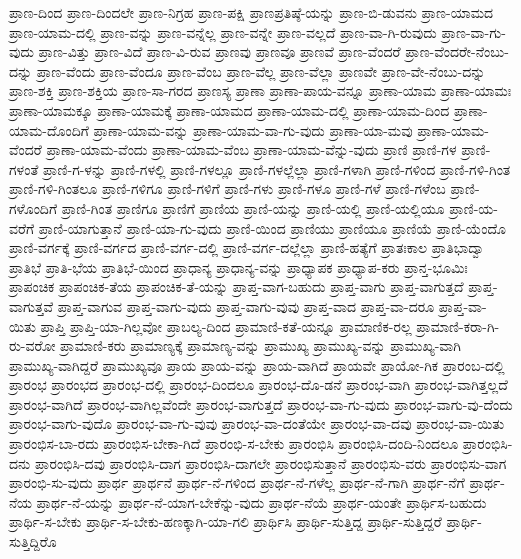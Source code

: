 {ಪ್ರಾಣ-ದಿಂದ
ಪ್ರಾಣ-ದಿಂದಲೇ
ಪ್ರಾಣ-ನಿಗ್ರಹ
ಪ್ರಾಣ-ಪಕ್ಷಿ
ಪ್ರಾಣಪ್ರತಿಷ್ಠೆ-ಯನ್ನು
ಪ್ರಾಣ-ಬಿ-ಡುವನು
ಪ್ರಾಣ-ಯಾಮದ
ಪ್ರಾಣ-ಯಾಮ-ದಲ್ಲಿ
ಪ್ರಾಣ-ವನ್ನು
ಪ್ರಾಣ-ವನ್ನೆಲ್ಲ
ಪ್ರಾಣ-ವನ್ನೇ
ಪ್ರಾಣ-ವಲ್ಲದೆ
ಪ್ರಾಣ-ವಾ-ಗಿ-ರುವುದು
ಪ್ರಾಣ-ವಾ-ಗು-ವುದು
ಪ್ರಾಣ-ವಿತ್ತು
ಪ್ರಾಣ-ವಿದೆ
ಪ್ರಾಣ-ವಿ-ರುವ
ಪ್ರಾಣವು
ಪ್ರಾಣವೂ
ಪ್ರಾಣವೆ
ಪ್ರಾಣ-ವೆಂದರೆ
ಪ್ರಾಣ-ವೆಂದರೇ-ನೆಂಬು-ದನ್ನು
ಪ್ರಾಣ-ವೆಂದು
ಪ್ರಾಣ-ವೆಂದೂ
ಪ್ರಾಣ-ವೆಂಬ
ಪ್ರಾಣ-ವೆಲ್ಲ
ಪ್ರಾಣ-ವೆಲ್ಲಾ
ಪ್ರಾಣವೇ
ಪ್ರಾಣ-ವೇ-ನೆಂಬು-ದನ್ನು
ಪ್ರಾಣ-ಶಕ್ತಿ
ಪ್ರಾಣ-ಶಕ್ತಿಯ
ಪ್ರಾಣ-ಸಾ-ಗರದ
ಪ್ರಾಣಸ್ಯ
ಪ್ರಾಣಾ
ಪ್ರಾಣಾ-ಪಾಯ-ವನ್ನೂ
ಪ್ರಾಣಾ-ಯಾಮ
ಪ್ರಾಣಾ-ಯಾಮಃ
ಪ್ರಾಣಾ-ಯಾಮಕ್ಕೂ
ಪ್ರಾಣಾ-ಯಾಮಕ್ಕೆ
ಪ್ರಾಣಾ-ಯಾಮದ
ಪ್ರಾಣಾ-ಯಾಮ-ದಲ್ಲಿ
ಪ್ರಾಣಾ-ಯಾಮ-ದಿಂದ
ಪ್ರಾಣಾ-ಯಾಮ-ದೊಂದಿಗೆ
ಪ್ರಾಣಾ-ಯಾಮ-ವನ್ನು
ಪ್ರಾಣಾ-ಯಾಮ-ವಾ-ಗು-ವುದು
ಪ್ರಾಣಾ-ಯಾ-ಮವು
ಪ್ರಾಣಾ-ಯಾಮ-ವೆಂದರೆ
ಪ್ರಾಣಾ-ಯಾಮ-ವೆಂದು
ಪ್ರಾಣಾ-ಯಾಮ-ವೆಂಬ
ಪ್ರಾಣಾ-ಯಾಮ-ವೆನ್ನು-ವುದು
ಪ್ರಾಣಿ
ಪ್ರಾಣಿ-ಗಳ
ಪ್ರಾಣಿ-ಗಳಂತೆ
ಪ್ರಾಣಿ-ಗ-ಳನ್ನು
ಪ್ರಾಣಿ-ಗಳಲ್ಲಿ
ಪ್ರಾಣಿ-ಗಳಲ್ಲೂ
ಪ್ರಾಣಿ-ಗಳಲ್ಲೆಲ್ಲಾ
ಪ್ರಾಣಿ-ಗಳಾಗಿ
ಪ್ರಾಣಿ-ಗಳಿಂದ
ಪ್ರಾಣಿ-ಗಳಿ-ಗಿಂತ
ಪ್ರಾಣಿ-ಗಳಿ-ಗಿಂತಲೂ
ಪ್ರಾಣಿ-ಗಳಿಗೂ
ಪ್ರಾಣಿ-ಗಳಿಗೆ
ಪ್ರಾಣಿ-ಗಳು
ಪ್ರಾಣಿ-ಗಳೂ
ಪ್ರಾಣಿ-ಗಳೆ
ಪ್ರಾಣಿ-ಗಳೆಂಬ
ಪ್ರಾಣಿ-ಗಳೊಂದಿಗೆ
ಪ್ರಾಣಿ-ಗಿಂತ
ಪ್ರಾಣಿಗೂ
ಪ್ರಾಣಿಗೆ
ಪ್ರಾಣಿಯ
ಪ್ರಾಣಿ-ಯನ್ನು
ಪ್ರಾಣಿ-ಯಲ್ಲಿ
ಪ್ರಾಣಿ-ಯಲ್ಲಿಯೂ
ಪ್ರಾಣಿ-ಯ-ವರೆಗೆ
ಪ್ರಾಣಿ-ಯಾಗುತ್ತಾನೆ
ಪ್ರಾಣಿ-ಯಾ-ಗು-ವುದು
ಪ್ರಾಣಿ-ಯಿಂದ
ಪ್ರಾಣಿಯು
ಪ್ರಾಣಿಯೂ
ಪ್ರಾಣಿಯೆ
ಪ್ರಾಣಿ-ಯೆಂದೊ
ಪ್ರಾಣಿ-ವರ್ಗಕ್ಕೆ
ಪ್ರಾಣಿ-ವರ್ಗದ
ಪ್ರಾಣಿ-ವರ್ಗ-ದಲ್ಲಿ
ಪ್ರಾಣಿ-ವರ್ಗ-ದಲ್ಲೆಲ್ಲಾ
ಪ್ರಾಣಿ-ಹತ್ಯೆಗೆ
ಪ್ರಾತಃಕಾಲ
ಪ್ರಾತಿಭಾದ್ವಾ
ಪ್ರಾತಿಭೆ
ಪ್ರಾತಿ-ಭೆಯ
ಪ್ರಾತಿಭೆ-ಯಿಂದ
ಪ್ರಾಧಾನ್ಯ
ಪ್ರಾಧಾನ್ಯ-ವನ್ನು
ಪ್ರಾಧ್ಯಾಪಕ
ಪ್ರಾಧ್ಯಾಪ-ಕರು
ಪ್ರಾನ್ತ-ಭೂಮಿಃ
ಪ್ರಾಪಂಚಿಕ
ಪ್ರಾಪಂಚಿಕ-ತೆಯ
ಪ್ರಾಪಂಚಿಕ-ತೆ-ಯನ್ನು
ಪ್ರಾಪ್ತ-ವಾಗ-ಬಹುದು
ಪ್ರಾಪ್ತ-ವಾಗು
ಪ್ರಾಪ್ತ-ವಾಗುತ್ತದೆ
ಪ್ರಾಪ್ತ-ವಾಗುತ್ತವೆ
ಪ್ರಾಪ್ತ-ವಾಗುವ
ಪ್ರಾಪ್ತ-ವಾಗು-ವುದು
ಪ್ರಾಪ್ತ-ವಾಗು-ವುವು
ಪ್ರಾಪ್ತ-ವಾದ
ಪ್ರಾಪ್ತ-ವಾ-ದರೂ
ಪ್ರಾಪ್ತ-ವಾ-ಯಿತು
ಪ್ರಾಪ್ತಿ
ಪ್ರಾಪ್ತಿ-ಯಾ-ಗಿಲ್ಲವೋ
ಪ್ರಾಬಲ್ಯ-ದಿಂದ
ಪ್ರಾಮಾಣಿ-ಕತೆ-ಯನ್ನೂ
ಪ್ರಾಮಾಣಿಕ-ರಲ್ಲ
ಪ್ರಾಮಾಣಿ-ಕರಾ-ಗಿ-ರು-ವರೋ
ಪ್ರಾಮಾಣಿ-ಕರು
ಪ್ರಾಮಾಣ್ಯಕ್ಕೆ
ಪ್ರಾಮಾಣ್ಯ-ವನ್ನು
ಪ್ರಾಮುಖ್ಯ
ಪ್ರಾಮುಖ್ಯ-ವನ್ನು
ಪ್ರಾಮುಖ್ಯ-ವಾಗಿ
ಪ್ರಾಮುಖ್ಯ-ವಾಗಿದ್ದರೆ
ಪ್ರಾಮುಖ್ಯವೂ
ಪ್ರಾಯ
ಪ್ರಾಯ-ವನ್ನು
ಪ್ರಾಯ-ವಾಗಿದೆ
ಪ್ರಾಯವೇ
ಪ್ರಾಯೋ-ಗಿಕ
ಪ್ರಾರಂಬ-ದಲ್ಲಿ
ಪ್ರಾರಂಭ
ಪ್ರಾರಂಭದ
ಪ್ರಾರಂಭ-ದಲ್ಲಿ
ಪ್ರಾರಂಭ-ದಿಂದಲೂ
ಪ್ರಾರಂಭ-ದೊ-ಡನೆ
ಪ್ರಾರಂಭ-ವಾಗಿ
ಪ್ರಾರಂಭ-ವಾಗಿತ್ತಲ್ಲದೆ
ಪ್ರಾರಂಭ-ವಾಗಿದೆ
ಪ್ರಾರಂಭ-ವಾಗಿಲ್ಲವೆಂದೇ
ಪ್ರಾರಂಭ-ವಾಗುತ್ತದೆ
ಪ್ರಾರಂಭ-ವಾ-ಗು-ವುದು
ಪ್ರಾರಂಭ-ವಾಗು-ವು-ದೆಂದು
ಪ್ರಾರಂಭ-ವಾಗು-ವುದೊ
ಪ್ರಾರಂಭ-ವಾ-ಗು-ವುವು
ಪ್ರಾರಂಭ-ವಾ-ದಂತೆಯೇ
ಪ್ರಾರಂಭ-ವಾ-ದವು
ಪ್ರಾರಂಭ-ವಾ-ಯಿತು
ಪ್ರಾರಂಭಿಸ-ಬಾ-ರದು
ಪ್ರಾರಂಭಿಸ-ಬೇಕಾ-ಗಿದೆ
ಪ್ರಾರಂಭಿ-ಸ-ಬೇಕು
ಪ್ರಾರಂಭಿಸಿ
ಪ್ರಾರಂಭಿಸಿ-ದಂದಿ-ನಿಂದಲೂ
ಪ್ರಾರಂಭಿಸಿ-ದನು
ಪ್ರಾರಂಭಿಸಿ-ದವು
ಪ್ರಾರಂಭಿಸಿ-ದಾಗ
ಪ್ರಾರಂಭಿಸಿ-ದಾಗಲೇ
ಪ್ರಾರಂಭಿಸುತ್ತಾನೆ
ಪ್ರಾರಂಭಿಸು-ವರು
ಪ್ರಾರಂಭಿಸು-ವಾಗ
ಪ್ರಾರಂಭಿ-ಸು-ವುದು
ಪ್ರಾರ್ಥ
ಪ್ರಾರ್ಥನೆ
ಪ್ರಾರ್ಥ-ನೆ-ಗಳಿಂದ
ಪ್ರಾರ್ಥ-ನೆ-ಗಳೆಲ್ಲ
ಪ್ರಾರ್ಥ-ನೆ-ಗಾಗಿ
ಪ್ರಾರ್ಥ-ನೆಗೆ
ಪ್ರಾರ್ಥ-ನೆಯ
ಪ್ರಾರ್ಥ-ನೆ-ಯನ್ನು
ಪ್ರಾರ್ಥ-ನೆ-ಯಾಗ-ಬೇಕೆನ್ನು-ವುದು
ಪ್ರಾರ್ಥ-ನೆಯೆ
ಪ್ರಾರ್ಥ-ಯಂತೇ
ಪ್ರಾರ್ಥಿಸ-ಬಹುದು
ಪ್ರಾರ್ಥಿ-ಸ-ಬೇಕು
ಪ್ರಾರ್ಥಿ-ಸ-ಬೇಕು-ಹಣಕ್ಕಾಗಿ-ಯಾ-ಗಲಿ
ಪ್ರಾರ್ಥಿಸಿ
ಪ್ರಾರ್ಥಿ-ಸುತ್ತಿದ್ದ
ಪ್ರಾರ್ಥಿ-ಸುತ್ತಿದ್ದರೆ
ಪ್ರಾರ್ಥಿ-ಸುತ್ತಿದ್ದಿರೊ
}
